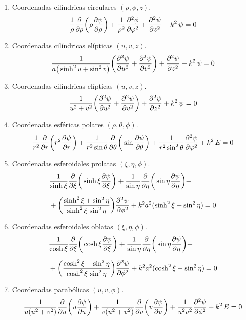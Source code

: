 \documentclass[12pt]{article}
\numberwithin{equation}{section}
\begin{document}
\begin{enumerate}
\item Coordenadas cilíndricas circulares $(\rho, \phi, z)$.
\begin{align*}
\dfrac{1}{\rho} \pdv{\rho} \bigg( \rho \pdv{\psi}{\rho} \bigg) + \dfrac{1}{\rho^{2}} \pdv[2]{\phi}{\varphi} + \pdv[2]{\psi}{z} + k^{2} \, \psi = 0
\end{align*}
\item Coordenadas cilíndricas elípticas $(u, v, z)$.
\begin{align*}
\dfrac{1}{a \big( \sinh^{2} u + \sin^{2} v \big)} \bigg( \pdv[2]{\psi}{u} + \pdv[2]{\psi}{v} \bigg) + \pdv[2]{\psi}{z} + k^{2} \, \psi = 0
\end{align*}
\item Coordenadas cilíndricas elípticas $(u, v, z)$.
\begin{align*}
\dfrac{1}{u^{2} + v^{2}} \bigg( \pdv[2]{\psi}{u} + \pdv[2]{\psi}{v} \bigg) + \pdv[2]{\psi}{z} + k^{2} \, \psi = 0
\end{align*}
\item Coordenadas esféricas polares $(\rho, \theta, \phi)$.
\begin{align*}
\dfrac{1}{r^{2}} \pdv{r} \bigg( r^{2} \pdv{\psi}{r} \bigg) + \dfrac{1}{r^{2} \sin \theta} \pdv{\theta} \bigg( \sin \pdv{\psi}{\theta} \bigg) + \dfrac{1}{r^{2} \sin^{2} \theta} \pdv[2]{\psi}{\varphi} + k^{2} \, E = 0
\end{align*}
\item Coordenadas esferoidales prolatas $(\xi, \eta, \phi)$.
\begin{align*}
&\dfrac{1}{\sinh \xi} \pdv{\xi} \bigg( \sinh \xi \pdv{\psi}{\xi} \bigg) + \dfrac{1}{\sin \eta} \pdv{\eta} \bigg( \sin \eta \pdv{\psi}{\eta} \bigg) + \\[0.5em]
&+ \bigg( \dfrac{\sinh^{2} \xi + \sin^{2} \eta}{\sinh^{2} \xi \, \sin^{2} \eta} \bigg) \pdv[2]{\psi}{\phi} + k^{2} a^{2} (\sinh^{2} \xi + \sin^{2} \eta) = 0
\end{align*}
\item Coordenadas esferoidales oblatas $(\xi, \eta, \phi)$.
\begin{align*}
&\dfrac{1}{\cosh \xi} \pdv{\xi} \bigg( \cosh \xi \pdv{\psi}{\xi} \bigg) + \dfrac{1}{\sin \eta} \pdv{\eta} \bigg( \sin \eta \pdv{\psi}{\eta} \bigg) + \\[0.5em]
&+ \bigg( \dfrac{\cosh^{2} \xi - \sin^{2} \eta}{\cosh^{2} \xi \, \sin^{2} \eta} \bigg) \pdv[2]{\psi}{\phi} + k^{2} a^{2} (\cosh^{2} \xi - \sin^{2} \eta) = 0
\end{align*}
\item Coordenadas parabólicas $(u, v, \phi)$.
\begin{align*}
\dfrac{1}{u (u^{2} + v^{2})} \pdv{u} \bigg( u \pdv{\psi}{u} \bigg) + \dfrac{1}{v (u^{2} + v^{2})} \pdv{v} \bigg( v  \pdv{\psi}{v} \bigg) + \dfrac{1}{u^{2} v^{2}} \pdv[2]{\psi}{\phi} +k^{2} \, E = 0
\end{align*}
\end{enumerate}
\end{document}
